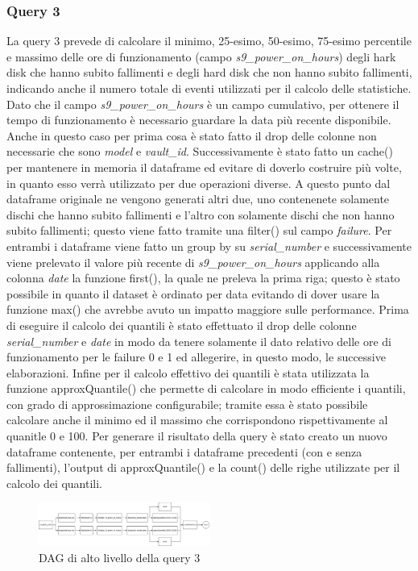 \documentclass[conference]{IEEEtran}
\begin{document}
\subsubsection{Query 3}
La query 3 prevede di calcolare il minimo, 25-esimo, 50-esimo, 75-esimo percentile e massimo delle ore di funzionamento (campo \textit{s9\_power\_on\_hours}) degli hark disk che hanno subito fallimenti e degli hard disk che non hanno subito fallimenti, indicando anche il numero totale di eventi utilizzati per il calcolo delle statistiche. 
Dato che il campo \textit{s9\_power\_on\_hours} è un campo cumulativo, per ottenere il tempo di funzionamento è necessario guardare la data più recente disponibile. \\
Anche in questo caso per prima cosa è stato fatto il drop delle colonne non necessarie che sono \textit{model} e \textit{vault\_id}. Successivamente è stato fatto un cache() per mantenere in memoria il dataframe ed evitare di doverlo costruire più volte, in quanto esso verrà utilizzato per due operazioni diverse. A questo punto dal dataframe originale ne vengono generati altri due, uno contenenete solamente dischi che hanno subito fallimenti e l'altro con solamente dischi che non hanno subito fallimenti; questo viene fatto tramite una filter() sul campo \textit{failure}. Per entrambi i dataframe viene fatto un group by su \textit{serial\_number} e successivamente viene prelevato il valore più recente di \textit{s9\_power\_on\_hours} applicando alla colonna \textit{date} la funzione first(), la quale ne preleva la prima riga; questo è stato possibile in quanto il dataset è ordinato per data evitando di dover usare la funzione max() che avrebbe avuto un impatto maggiore sulle performance. Prima di eseguire il calcolo dei quantili è stato effettuato il drop delle colonne \textit{serial\_number} e \textit{date} in modo da tenere solamente il dato relativo delle ore di funzionamento per le failure 0 e 1 ed allegerire, in questo modo, le successive elaborazioni. Infine per il calcolo effettivo dei quantili è stata utilizzata la funzione approxQuantile() che permette di calcolare in modo efficiente i quantili, con grado di approssimazione configurabile; tramite essa è stato possibile calcolare anche il minimo ed il massimo che corrispondono rispettivamente al quanitle 0 e 100. Per generare il risultato della query è stato creato un nuovo dataframe contenente, per entrambi i dataframe precedenti (con e senza fallimenti), l'output di approxQuantile() e la count() delle righe utilizzate per il calcolo dei quantili.
\begin{figure}[H]
    \centerline{\includegraphics[width=0.5\textwidth]{res/query3_dag.png}}
    \caption{DAG di alto livello della query 3}
    \label{fig:dag_query3}
\end{figure}
\end{document}
